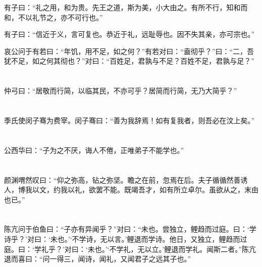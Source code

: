 \documentclass[a5paper]{ctexbook}
\begin{document}
    有子曰：“礼之用，和为贵。先王之道，斯为美，小大由之。有所不行，知和而和，不以礼节之，亦不可行也。”

    有子曰：“信近于义，言可复也。恭近于礼，远耻辱也。因不失其亲，亦可宗也。”

    哀公问于有若曰：“年饥，用不足，如之何？”有若对曰：“盍彻乎？”曰：“二，吾犹不足，如之何其彻也？”对曰：“百姓足，君孰与不足？百姓不足，君孰与足？”

    \chapter{}

    仲弓曰：“居敬而行简，以临其民，不亦可乎？居简而行简，无乃大简乎？”

    \chapter{}

    季氏使闵子骞为费宰。闵子骞曰：“善为我辞焉！如有复我者，则吾必在汶上矣。”

    \chapter{}

    公西华曰：“子为之不厌，诲人不倦，正唯弟子不能学也。”

    \chapter{}

    颜渊喟然叹曰：“仰之弥高，钻之弥坚。瞻之在前，忽焉在后。夫子循循然善诱人，博我以文，约我以礼，欲罢不能。既竭吾才，如有所立卓尔。虽欲从之，末由也已。”

    \chapter{}

    陈亢问于伯鱼曰：“子亦有异闻乎？”对曰：“未也。尝独立，鲤趋而过庭。曰：‘学诗乎？’对曰：‘未也。’‘不学诗，无以言。’鲤退而学诗。他日，又独立，鲤趋而过庭。曰：‘学礼乎？’对曰：‘未也。’‘不学礼，无以立。’鲤退而学礼。闻斯二者。”陈亢退而喜曰：“问一得三，闻诗，闻礼，又闻君子之远其子也。”
\end{document}
